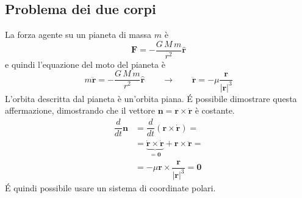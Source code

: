 \subsection{Problema dei due corpi}
La forza agente su un pianeta di massa $m$ è
\begin{equation}
    \mathbf{F} = - \dfrac{G \, M \, m}{r^2} \mathbf{\hat{r}}
\end{equation}
e quindi l'equazione del moto del pianeta è
\begin{equation}
    m \ddot{\mathbf{r}} = - \dfrac{G \, M \, m}{r^2} \mathbf{\hat{r}}
    \qquad \rightarrow \qquad
    \ddot{\mathbf{r}} = - \mu \dfrac{\mathbf{r}}{|\mathbf{r}|^3}
\end{equation}
L'orbita descritta dal pianeta è un'orbita piana. \'E possibile dimostrare questa affermazione, dimostrando che il vettore $\mathbf{n} = \mathbf{r} \times \dot{\mathbf{r}}$ è costante.
\begin{equation}
\begin{aligned}
    \dfrac{d}{dt} \mathbf{n}
    & = \dfrac{d}{dt} \left( \mathbf{r} \times \dot{\mathbf{r}} \right) = \\
    & = \underbrace{\dot{\mathbf{r}} \times \dot{\mathbf{r}}}_{=\mathbf{0}} + \mathbf{r} \times \ddot{\mathbf{r}} = \\
    & = - \mu \mathbf{r} \times \dfrac{\mathbf{r}}{|\mathbf{r}|^3} = \mathbf{0}
\end{aligned}
\end{equation}
\'E quindi possibile usare un sistema di coordinate polari.

